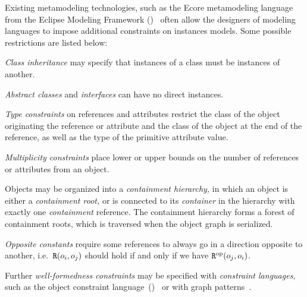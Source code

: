 Existing metamodeling technologies, such as the Ecore metamodeling language from the Eclipse Modeling Framework ()~\citep{Steinberg09emf} often allow the designers of modeling languages to impose additional constraints on instances models. Some possible restrictions are listed below: 
\begin{itemize*}
\item \emph{Class inheritance} may specify that instances of a class must be instances of another.
\item \emph{Abstract classes} and \emph{interfaces} can have no direct instances.
\item \emph{Type constraints} on references and attributes restrict the class of the object originating the reference or attribute and the class of the object at the end of the reference, as well as the type of the primitive attribute value.
\item \emph{Multiplicity constraints} place lower or upper bounds on the number of references or attributes from an object.
\item Objects may be organized into a \emph{containment hierarchy,} in which an object is either a \emph{containment root,} or is connected to its \emph{container} in the hierarchy with exactly one \emph{containment} reference. The containment hierarchy forms a forest of containment roots, which is traversed when the object graph is serialized.
\item \emph{Opposite constants} require some references to always go in a direction opposite to another, i.e.~\(\texttt{\upshape R}(o_i, o_j)\) should hold if and only if we have \(\texttt{\upshape R}^{\textrm{op}}(o_j, o_i)\).
\end{itemize*}

Further \emph{well-formedness constraints} may be specified with \emph{constraint languages,} such as the object constraint language~()~\citep{OMG14ocl} or with graph patterns~\citep{Bergmann11validation}.

